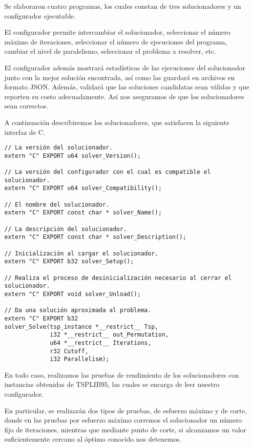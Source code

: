 \documentclass[main.tex]{subfiles}
\begin{document}
Se elaboraron cuatro programas, los cuales constan de tres solucionadores y un
configurador ejecutable.

El configurador permite intercambiar el solucionador, seleccionar el número
máximo de iteraciones, seleccionar el número de ejecuciones del programa,
cambiar el nivel de paralelismo, seleccionar el problema a resolver, etc.

El configurador además mostrará estadísticas de las ejecuciones del
solucionador junto con la mejor solución encontrada, así como las guardará en
archivos en formato JSON. Además, validará que las soluciones candidatas sean
válidas y que reporten su costo adecuadamente. Así nos aseguramos de que los
solucionadores sean correctos.

A continuación describiremos los solucionadores, que satisfacen la siguiente
interfaz de C.

\begin{verbatim}
// La versión del solucionador.
extern "C" EXPORT u64 solver_Version();

// La versión del configurador con el cual es compatible el solucionador.
extern "C" EXPORT u64 solver_Compatibility();

// El nombre del solucionador.
extern "C" EXPORT const char * solver_Name();

// La descripción del solucionador.
extern "C" EXPORT const char * solver_Description();

// Inicialización al cargar el solucionador.
extern "C" EXPORT b32 solver_Setup();

// Realiza el proceso de desinicialización necesario al cerrar el solucionador.
extern "C" EXPORT void solver_Unload();

// Da una solución aproximada al problema.
extern "C" EXPORT b32
solver_Solve(tsp_instance *__restrict__ Tsp,
             i32 *__restrict__ out_Permutation,
             u64 *__restrict__ Iterations,
             r32 Cutoff,
             i32 Parallelism);
\end{verbatim}

En todo caso, realizamos las pruebas de rendimiento de los solucionadores con
instancias obtenidas de TSPLIB95, las cuales se encarga de leer nuestro
configurador.

En particular, se realizarán dos tipos de pruebas, de esfuerzo máximo y de
corte, donde en las pruebas por esfuerzo máximo corremos el solucionador un
número fijo de iteraciones, mientras que mediante punto de corte, si alcanzamos
un valor suficientemente cercano al óptimo conocido nos detenemos.
\end{document}
